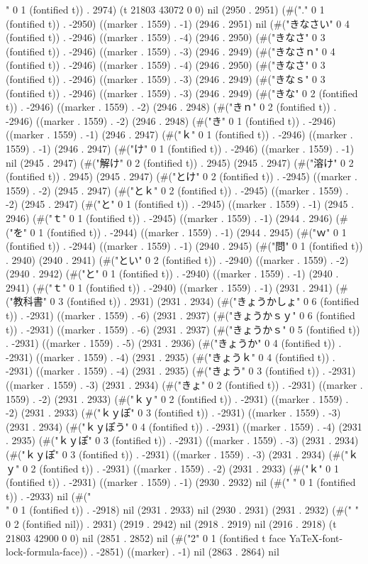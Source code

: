 {" 0 1 (fontified t)) . 2974) (t 21803 43072 0 0) nil (2950 . 2951) (#("." 0 1 (fontified t)) . -2950) ((marker . 1559) . -1) (2946 . 2951) nil (#("きなさい" 0 4 (fontified t)) . -2946) ((marker . 1559) . -4) (2946 . 2950) (#("きなさ" 0 3 (fontified t)) . -2946) ((marker . 1559) . -3) (2946 . 2949) (#("きなさｎ" 0 4 (fontified t)) . -2946) ((marker . 1559) . -4) (2946 . 2950) (#("きなさ" 0 3 (fontified t)) . -2946) ((marker . 1559) . -3) (2946 . 2949) (#("きなｓ" 0 3 (fontified t)) . -2946) ((marker . 1559) . -3) (2946 . 2949) (#("きな" 0 2 (fontified t)) . -2946) ((marker . 1559) . -2) (2946 . 2948) (#("きｎ" 0 2 (fontified t)) . -2946) ((marker . 1559) . -2) (2946 . 2948) (#("き" 0 1 (fontified t)) . -2946) ((marker . 1559) . -1) (2946 . 2947) (#("ｋ" 0 1 (fontified t)) . -2946) ((marker . 1559) . -1) (2946 . 2947) (#("け" 0 1 (fontified t)) . -2946) ((marker . 1559) . -1) nil (2945 . 2947) (#("解け" 0 2 (fontified t)) . 2945) (2945 . 2947) (#("溶け" 0 2 (fontified t)) . 2945) (2945 . 2947) (#("とけ" 0 2 (fontified t)) . -2945) ((marker . 1559) . -2) (2945 . 2947) (#("とｋ" 0 2 (fontified t)) . -2945) ((marker . 1559) . -2) (2945 . 2947) (#("と" 0 1 (fontified t)) . -2945) ((marker . 1559) . -1) (2945 . 2946) (#("ｔ" 0 1 (fontified t)) . -2945) ((marker . 1559) . -1) (2944 . 2946) (#("を" 0 1 (fontified t)) . -2944) ((marker . 1559) . -1) (2944 . 2945) (#("ｗ" 0 1 (fontified t)) . -2944) ((marker . 1559) . -1) (2940 . 2945) (#("問" 0 1 (fontified t)) . 2940) (2940 . 2941) (#("とい" 0 2 (fontified t)) . -2940) ((marker . 1559) . -2) (2940 . 2942) (#("と" 0 1 (fontified t)) . -2940) ((marker . 1559) . -1) (2940 . 2941) (#("ｔ" 0 1 (fontified t)) . -2940) ((marker . 1559) . -1) (2931 . 2941) (#("教科書" 0 3 (fontified t)) . 2931) (2931 . 2934) (#("きょうかしょ" 0 6 (fontified t)) . -2931) ((marker . 1559) . -6) (2931 . 2937) (#("きょうかｓｙ" 0 6 (fontified t)) . -2931) ((marker . 1559) . -6) (2931 . 2937) (#("きょうかｓ" 0 5 (fontified t)) . -2931) ((marker . 1559) . -5) (2931 . 2936) (#("きょうか" 0 4 (fontified t)) . -2931) ((marker . 1559) . -4) (2931 . 2935) (#("きょうｋ" 0 4 (fontified t)) . -2931) ((marker . 1559) . -4) (2931 . 2935) (#("きょう" 0 3 (fontified t)) . -2931) ((marker . 1559) . -3) (2931 . 2934) (#("きょ" 0 2 (fontified t)) . -2931) ((marker . 1559) . -2) (2931 . 2933) (#("ｋｙ" 0 2 (fontified t)) . -2931) ((marker . 1559) . -2) (2931 . 2933) (#("ｋｙぽ" 0 3 (fontified t)) . -2931) ((marker . 1559) . -3) (2931 . 2934) (#("ｋｙぽう" 0 4 (fontified t)) . -2931) ((marker . 1559) . -4) (2931 . 2935) (#("ｋｙぽ" 0 3 (fontified t)) . -2931) ((marker . 1559) . -3) (2931 . 2934) (#("ｋｙぽ" 0 3 (fontified t)) . -2931) ((marker . 1559) . -3) (2931 . 2934) (#("ｋｙ" 0 2 (fontified t)) . -2931) ((marker . 1559) . -2) (2931 . 2933) (#("ｋ" 0 1 (fontified t)) . -2931) ((marker . 1559) . -1) (2930 . 2932) nil (#(" " 0 1 (fontified t)) . -2933) nil (#("\\" 0 1 (fontified t)) . -2918) nil (2931 . 2933) nil (2930 . 2931) (2931 . 2932) (#("  " 0 2 (fontified nil)) . 2931) (2919 . 2942) nil (2918 . 2919) nil (2916 . 2918) (t 21803 42900 0 0) nil (2851 . 2852) nil (#("2" 0 1 (fontified t face YaTeX-font-lock-formula-face)) . -2851) ((marker) . -1) nil (2863 . 2864) nil }
